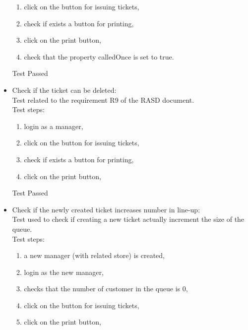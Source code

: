 \begin{itemize}
\begin{enumerate}
        \item click on the button for issuing tickets,

        \item check if exists a button for printing,

        \item click on the print button,

        \item check that the property calledOnce is set to true.
    \end{enumerate}
    Test Passed \\

    \item Check if the ticket can be deleted: \\
    Test related to the requirement R9 of the RASD document. \\
    Test steps: \\
    \begin{enumerate}
        \item login as a manager,

        \item click on the button for issuing tickets,

        \item check if exists a button for printing,

        \item click on the print button,
    \end{enumerate}
    Test Passed\\

    \item Check if the newly created ticket increases number in line-up: \\
    Test used to check if creating a new ticket actually increment the size of the queue. \\
    Test steps: \\
    \begin{enumerate}
        \item a new manager (with related store) is created,

        \item login as the new manager,

        \item checks that the number of customer in the queue is 0,

        \item click on the button for issuing tickets,

        \item click on the print button,


\end{enumerate}
\end{itemize}
